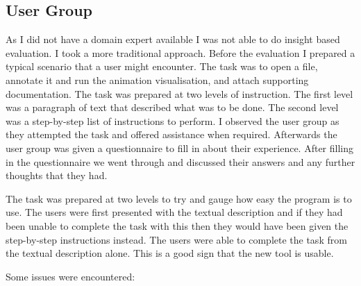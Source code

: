 \subsection{User Group}

As I did not have a domain expert available I was not able to do insight based evaluation.  I took a more traditional approach.  Before the evaluation I prepared a typical scenario that a user might encounter.  The task was to open a file, annotate it and run the animation visualisation, and attach supporting documentation.  The task was prepared at two levels of instruction.  The first level was a paragraph of text that described what was to be done.  The second level was a step-by-step list of instructions to perform.  I observed the user group as they attempted the task and offered assistance when required.  Afterwards the user group was given a questionnaire to fill in about their experience. After filling in the questionnaire we went through and discussed their answers and any further thoughts that they had.

The task was prepared at two levels to try and gauge how easy the program is to use.  The users were first presented with the textual description and if they had been unable to complete the task with this then they would have been given the step-by-step instructions instead.  The users were able to complete the task from the textual description alone.  This is a good sign that the new tool is usable.

Some issues were encountered:

